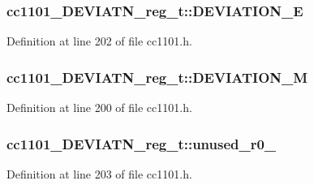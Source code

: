 \subsubsection[{\texorpdfstring{D\+E\+V\+I\+A\+T\+I\+O\+N\+\_\+E}{DEVIATION_E}}]{ cc1101\+\_\+\+D\+E\+V\+I\+A\+T\+N\+\_\+reg\+\_\+t\+::\+D\+E\+V\+I\+A\+T\+I\+O\+N\+\_\+E}\hypertarget{structcc1101___d_e_v_i_a_t_n__reg__t_a5f4a0e09f6a82b0c9210869d395ae699}{}\label{structcc1101___d_e_v_i_a_t_n__reg__t_a5f4a0e09f6a82b0c9210869d395ae699}


Definition at line 202 of file cc1101.\+h.

\subsubsection[{\texorpdfstring{D\+E\+V\+I\+A\+T\+I\+O\+N\+\_\+M}{DEVIATION_M}}]{ cc1101\+\_\+\+D\+E\+V\+I\+A\+T\+N\+\_\+reg\+\_\+t\+::\+D\+E\+V\+I\+A\+T\+I\+O\+N\+\_\+M}\hypertarget{structcc1101___d_e_v_i_a_t_n__reg__t_a4fcd7ef47b37ed3880a333a02d46728e}{}\label{structcc1101___d_e_v_i_a_t_n__reg__t_a4fcd7ef47b37ed3880a333a02d46728e}


Definition at line 200 of file cc1101.\+h.

\subsubsection[{\texorpdfstring{unused\+\_\+r0\+\_\+1}{unused_r0_1}}]{ cc1101\+\_\+\+D\+E\+V\+I\+A\+T\+N\+\_\+reg\+\_\+t\+::unused\+\_\+r0\+\_}\hypertarget{structcc1101___d_e_v_i_a_t_n__reg__t_aa5462e40708c2f9c154f219becffb181}{}\label{structcc1101___d_e_v_i_a_t_n__reg__t_aa5462e40708c2f9c154f219becffb181}


Definition at line 203 of file cc1101.\+h.

